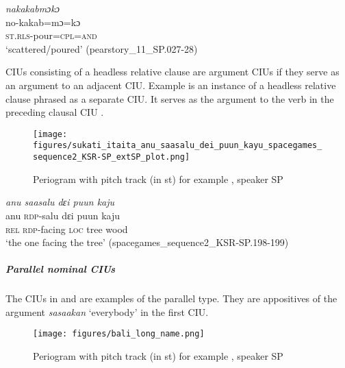 {
	\ex
	\label{ex:nakakabmoko}
	\textit{nakakabmɔkɔ} \\
	\gll no-kakab=mɔ=kɔ \\
	\textsc{st.rls}-pour=\textsc{cpl=and}\\
	\glt `scattered/poured'
	\hfill(pearstory\_11\_SP.027-28)
}
\z
\z


CIUs consisting of a headless relative clause are argument CIUs if they serve as an argument to an adjacent CIU.  Example  is an instance of a headless relative clause phrased as a separate CIU. It serves as the argument to the verb in the preceding clausal CIU .

\begin{figure}
	\texttt{[image: figures/sukati\_itaita\_anu\_saasalu\_dei\_puun\_kayu\_spacegames\_sequence2\_KSR-SP\_extSP\_plot.png]}
	\caption{Periogram with pitch track (in st) for example , speaker SP}
	\label{pitch:Rel wo head}
\end{figure}




\ea
\label{ex:Rel wo head}

{
	\ex
	\label{ex:anu saasalu dɛi puun kayu}
	\textit{anu saasalu dɛi puun kaju} \\
	\gll anu \textsc{rdp}-salu dɛi puun kaju \\
	\textsc{rel} \textsc{rdp}-facing \textsc{loc} tree wood\\
	\glt `the one facing the tree'
	\hfill(spacegames\_sequence2\_KSR-SP.198-199)
}
\z
\z




\subparagraph{Parallel nominal CIUs}
\label{sec:parallel-nominal-cius}

The CIUs in  and   are examples of the parallel type. They are appositives of the argument \textit{sasaakan} `everybody' in the first CIU.


\begin{figure}
	\texttt{[image: figures/bali\_long\_name.png]}
	\caption{Periogram with pitch track (in st) for example , speaker SP}
	\label{pitch:Parallel NP IUs}
\end{figure}



